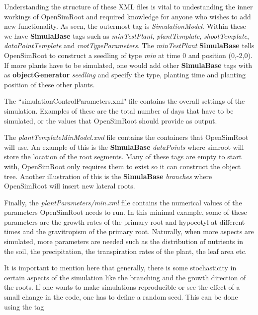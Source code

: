 \documentclass{article}
\begin{document}
\noindent Understanding the structure of these XML files is vital to undestanding the inner workings of OpenSimRoot and required knowledge for anyone who wishes to add new functionality. As seen, the outermost tag is \textit{SimulationModel}. Within these we have \textbf{SimulaBase} tags such as \textit{minTestPlant}, \textit{plantTemplate}, \textit{shootTemplate}, \textit{dataPointTemplate} and \textit{rootTypeParameters}. The \textit{minTestPlant} \textbf{SimulaBase} tells OpenSimRoot to construct a seedling of type \textit{min} at time 0 and position (0,-2,0). If more plants have to be simulated, one would add other \textbf{SimulaBase} tags with as \textbf{objectGenerator} \textit{seedling} and specify the type, planting time and planting position of these other plants. \newline

\noindent The ``simulationControlParameters.xml" file contains the overall settings of the simulation. Examples of these are the total number of days that have to be simulated, or the values that OpenSimRoot should provide as output. \newline

\noindent The \textit{plantTemplateMinModel.xml} file contains the containers that OpenSimRoot will use. An example of this is the \textbf{SimulaBase} \textit{dataPoints} where simroot will store the location of the root segments. Many of these tags are empty to start with, OpenSimRoot only requires them to exist so it can construct the object tree. Another illustration of this is the \textbf{SimulaBase} \textit{branches} where OpenSimRoot will insert new lateral roots. \newline

\noindent Finally, the \textit{plantParameters/min.xml} file contains the numerical values of the parameters OpenSimRoot needs to run. In this minimal example, some of these parameters are the growth rates of the primary root and hypocotyl at different times and the gravitropism of the primary root. Naturally, when more aspects are simulated, more parameters are needed such as the distribution of nutrients in the soil, the precipitation, the transpiration rates of the plant, the leaf area etc. \newline

\noindent It is important to mention here that generally, there is some stochasticity in certain aspects of the simulation like the branching and the growth direction of the roots. If one wants to make simulations reproducible or see the effect of a small change in the code, one has to define a random seed. This can be done using the tag
\end{document}
